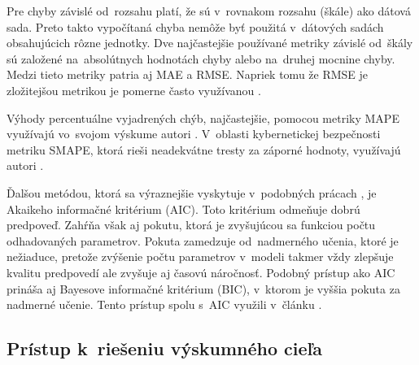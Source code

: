 \documentclass[thesismargins, thesislinespacing, openright, upjsfrontpage]{rnthesis}
\begin{document}
Pre chyby závislé od~rozsahu platí, že sú v~rovnakom rozsahu (škále) ako dátová sada. Preto takto vypočítaná chyba nemôže byť použitá v~dátových sadách obsahujúcich rôzne jednotky. Dve najčastejšie používané metriky závislé od~škály sú založené na~absolútnych hodnotách chyby alebo na~druhej mocnine chyby. Medzi tieto metriky patria aj MAE a RMSE. Napriek tomu že RMSE je zložitejšou metrikou je pomerne často využívanou \cite{tang2018disclosure,tang2017big,condon2008analysis}. 

Výhody percentuálne vyjadrených chýb, najčastejšie, pomocou metriky MAPE využívajú vo~svojom výskume autori \cite{jiang2004detecting,cortez2012multi,fang2019deep,tang2018disclosure,werner2017time}. V~oblasti kybernetickej bezpečnosti metriku SMAPE, ktorá rieši neadekvátne tresty za záporné hodnoty, využívajú autori \cite{roumani2015time,pokhrel2017cybersecurity}.

Ďalšou metódou, ktorá sa výraznejšie vyskytuje v~podobných prácach \cite{tang2016exploiting,zhan2015predicting,wei2012intrusion}, je Akaikeho informačné kritérium (AIC). Toto kritérium odmeňuje dobrú predpoveď. Zahŕňa však aj pokutu, ktorá je zvyšujúcou sa funkciou počtu odhadovaných parametrov. Pokuta zamedzuje od~nadmerného učenia, ktoré je nežiaduce, pretože zvýšenie počtu parametrov v~modeli takmer vždy zlepšuje kvalitu predpovedí ale zvyšuje aj časovú náročnosť. Podobný prístup ako AIC prináša aj Bayesove informačné kritérium (BIC), v~ktorom je vyššia pokuta za nadmerné učenie. Tento prístup spolu s~AIC využili v~článku \cite{tang2016exploiting}.


\subsection{Prístup k~riešeniu výskumného cieľa}
 
\end{document}
